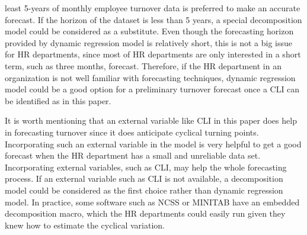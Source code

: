 least 5-years of monthly employee turnover data is preferred to make an accurate forecast. If the horizon of the dataset is less than 5 years, a special decomposition model \citep{ittig1997}could be considered as a substitute. Even though the forecasting horizon provided by dynamic regression model is relatively short, this is not a big issue for HR departments, since most of HR departments are only interested in a short term, such as three months, forecast. Therefore, if the HR department in an organization is not well familiar with forecasting techniques, dynamic regression model could be a good option for a preliminary turnover forecast once a CLI can be identified as in this paper. 

It is worth mentioning that an external variable like CLI in this paper does help in forecasting turnover since it does anticipate cyclical turning points. Incorporating such an external variable in the model is very helpful to get a good forecast when the HR department has a small and unreliable data set. Incorporating external variables, such as CLI, may help the whole forecasting process. If an external variable such as CLI is not available, a decomposition model could be considered as the first choice rather than dynamic regression model. In practice, some software such as NCSS or MINITAB have an embedded decomposition macro, which the HR departments could easily run given they knew how to estimate the cyclical variation.
